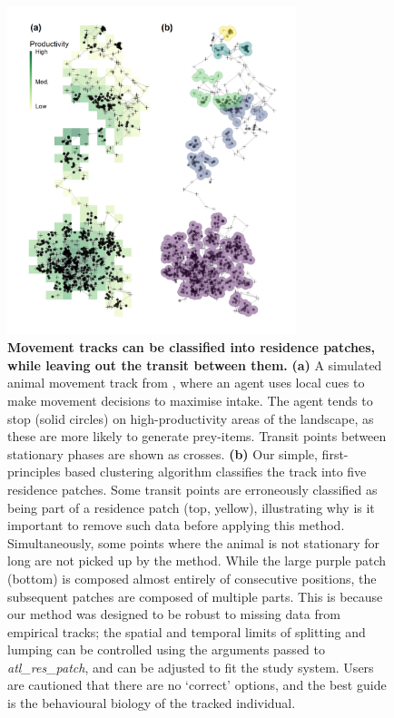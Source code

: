 \begin{figure}[h!]
    \centering
    \includegraphics[width=0.75\textwidth]{figures/preprocessing/fig_06.png}
    \caption{
        \textbf{Movement tracks can be classified into residence patches, while leaving out the transit between them.}
        \textbf{(a)} A simulated animal movement track from \citealt{gupte2021a}, where an agent uses local cues to make movement decisions to maximise intake.
        The agent tends to stop (solid circles) on high-productivity areas of the landscape, as these are more likely to generate prey-items.
        Transit points between stationary phases are shown as crosses.
        \textbf{(b)} Our simple, first-principles based clustering algorithm classifies the track into five residence patches. 
        Some transit points are erroneously classified as being part of a residence patch (top, yellow), illustrating why is it important to remove such data before applying this method.
        Simultaneously, some points where the animal is not stationary for long are not picked up by the method.
        While the large purple patch (bottom) is composed almost entirely of consecutive positions, the subsequent patches are composed of multiple parts.
        This is because our method was designed to be robust to missing data from empirical tracks; the spatial and temporal limits of splitting and lumping can be controlled using the arguments passed to \textit{atl\_res\_patch}, and can be adjusted to fit the study system.
        Users are cautioned that there are no `correct' options, and the best guide is the behavioural biology of the tracked individual.
    }
    \label{preproc_fig_06}
\end{figure}

